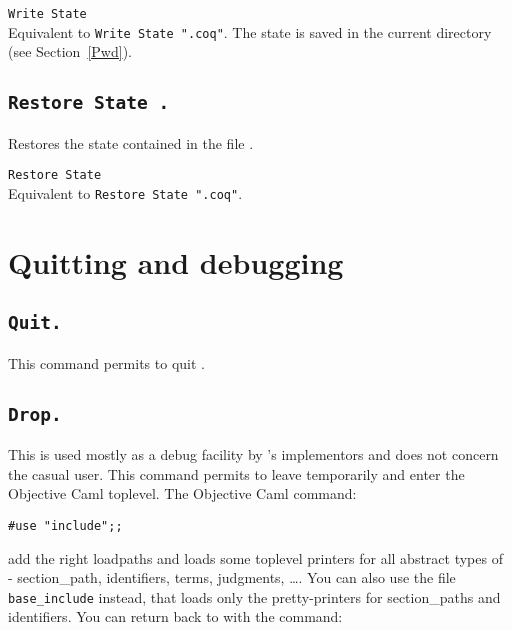 \begin{Variants}
\item {\tt Write State \ident}\\
 Equivalent to {\tt Write State "}{\ident}{\tt .coq"}.
 The state is saved in the current directory (see Section~\ref{Pwd}).
\end{Variants}

\subsection[\tt Restore State \str.]{\tt Restore State \str.}
  Restores the state contained in the file \str.

\begin{Variants}
\item {\tt Restore State \ident}\\
 Equivalent to {\tt Restore State "}{\ident}{\tt .coq"}.
\end{Variants}

\section{Quitting and debugging}

\subsection[\tt Quit.]{\tt Quit.}
This command permits to quit \Coq.

\subsection[\tt Drop.]{\tt Drop.\label{Drop}}

This is used mostly as a debug facility by \Coq's implementors
and does not concern the casual user.
This command permits to leave {\Coq} temporarily and enter the
Objective Caml toplevel. The Objective Caml command:

\begin{flushleft}
\begin{verbatim}
#use "include";;
\end{verbatim}
\end{flushleft}

\noindent add the right loadpaths and loads some toplevel printers for
all abstract types of \Coq - section\_path, identifiers, terms, judgments,
\dots. You can also use the file \texttt{base\_include} instead,
that loads only the pretty-printers for section\_paths and
identifiers.
You can return back to \Coq{} with the command: 


